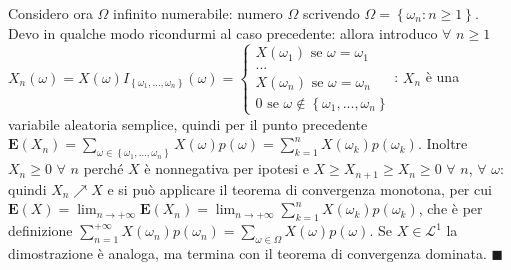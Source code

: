\documentclass{article}
\begin{document}
Considero ora $\Omega $ infinito numerabile: numero $\Omega $ scrivendo $%
\Omega =\left\{ \omega _{n}:n\geq 1\right\} $. Devo in qualche modo
ricondurmi al caso precedente: allora introduco $\forall $ $n\geq 1$ $%
X_{n}\left( \omega \right) =X\left( \omega \right) I_{\left\{ \omega
_{1},...,\omega _{n}\right\} }\left( \omega \right) =\left\{ 
\begin{array}{c}
X\left( \omega _{1}\right) \text{ se }\omega =\omega _{1} \\ 
... \\ 
X\left( \omega _{n}\right) \text{ se }\omega =\omega _{n} \\ 
0\text{ se }\omega \not\in \left\{ \omega _{1},...,\omega _{n}\right\}%
\end{array}%
\right. $: $X_{n}$ \`{e} una variabile aleatoria semplice, quindi per il
punto precedente $\mathbf{E}\left( X_{n}\right) =\sum_{\omega \in \left\{
\omega _{1},...,\omega _{n}\right\} }X\left( \omega \right) p\left( \omega
\right) =\sum_{k=1}^{n}X\left( \omega _{k}\right) p\left( \omega _{k}\right) 
$. Inoltre $X_{n}\geq 0$ $\forall $ $n$ perch\'{e} $X$ \`{e} nonnegativa per
ipotesi e $X\geq X_{n+1}\geq X_{n}\geq 0$ $\forall $ $n$, $\forall $ $\omega 
$: quindi $X_{n}\nearrow X$ e si pu\`{o} applicare il teorema di convergenza
monotona, per cui $\mathbf{E}\left( X\right) =\lim_{n\rightarrow +\infty }%
\mathbf{E}\left( X_{n}\right) =\lim_{n\rightarrow +\infty
}\sum_{k=1}^{n}X\left( \omega _{k}\right) p\left( \omega _{k}\right) $, che 
\`{e} per definizione $\sum_{n=1}^{+\infty }X\left( \omega _{n}\right)
p\left( \omega _{n}\right) =\sum_{\omega \in \Omega }X\left( \omega \right)
p\left( \omega \right) $. Se $X\in \mathcal{L}^{1}$ la dimostrazione \`{e}
analoga, ma termina con il teorema di convergenza dominata. $\blacksquare $
\end{document}
